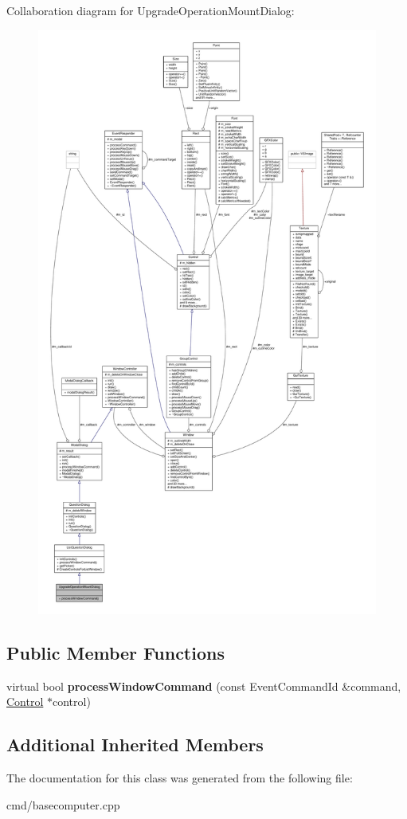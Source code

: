 Collaboration diagram for Upgrade\+Operation\+Mount\+Dialog\+:
\nopagebreak
\begin{figure}[H]
\begin{center}
\leavevmode
\includegraphics[height=550pt]{d5/d07/classUpgradeOperationMountDialog__coll__graph}
\end{center}
\end{figure}
\subsection*{Public Member Functions}
\begin{DoxyCompactItemize}
\item 
virtual bool {\bfseries process\+Window\+Command} (const Event\+Command\+Id \&command, \hyperlink{classControl}{Control} $\ast$control)\hypertarget{classUpgradeOperationMountDialog_a5ada08c99b76a48fc316c6d3957e6c2d}{}\label{classUpgradeOperationMountDialog_a5ada08c99b76a48fc316c6d3957e6c2d}

\end{DoxyCompactItemize}
\subsection*{Additional Inherited Members}


The documentation for this class was generated from the following file\+:\begin{DoxyCompactItemize}
\item 
cmd/basecomputer.\+cpp\end{DoxyCompactItemize}
